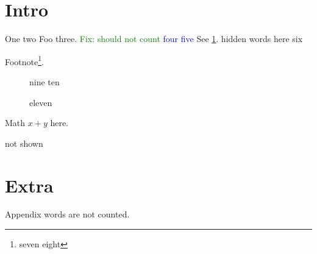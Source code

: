\documentclass{article}
\newif\ifdraft
\newcommand{\sys}{Foo}
\newcommand{\fixme}[1]{\textcolor{green}{Fix: #1}}
\newcommand{\rev}[1]{\textcolor{blue}{#1}}
\begin{document}
\begin{abstract}
Alpha beta gamma. We present \sys{}, a \emph{tiny} paper---for ``testing''.
\end{abstract}

\section{Intro}
\label{sec:intro}
One two \sys{} three.
\fixme{should not count}
\rev{four five}
See \cref{sec:intro}.
hidden words here
\else
six
\fi

Footnote\footnote{seven eight}.



\begin{figure}
\caption{nine ten}
\end{figure}
\begin{figure}
\caption{eleven}
\end{figure}

Math $x+y$ here.
\ifdraft
twelve
\else
not shown
\fi




\appendix
\section{Extra}
Appendix words are not counted.
\end{document}
